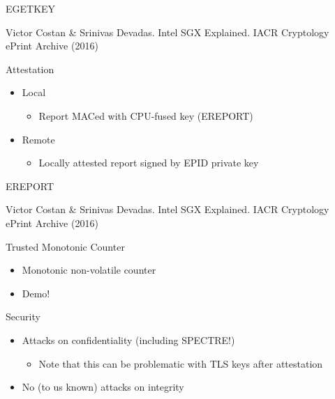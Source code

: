 \documentclass{beamer}
\begin{document}
	\begin{frame}{EGETKEY}
		

		\center\fontsize{4pt}{1}\selectfont
		Victor Costan \& Srinivas Devadas. Intel SGX Explained. IACR Cryptology ePrint Archive (2016)
	\end{frame}

	\begin{frame}{Attestation} %
		\begin{itemize}
			\item Local
				\begin{itemize}
					\item Report MACed with CPU-fused key (EREPORT)
				\end{itemize}
			\item Remote
				\begin{itemize}
					\item Locally attested report signed by EPID private key
				\end{itemize}
		\end{itemize}
	\end{frame}

	\begin{frame}{EREPORT}
		

		\center\fontsize{4pt}{1}\selectfont
		Victor Costan \& Srinivas Devadas. Intel SGX Explained. IACR Cryptology ePrint Archive (2016)
	\end{frame}

	\begin{frame}{Trusted Monotonic Counter} %
		\begin{itemize}
			\item Monotonic non-volatile counter
			\item Demo!
		\end{itemize}
	\end{frame}

	\begin{frame}{Security}	%
		\begin{itemize}
			\item Attacks on confidentiality (including SPECTRE!)
			\begin{itemize}
				\item Note that this can be problematic with TLS keys after attestation
			\end{itemize}
			\item No (to us known) attacks on integrity
		\end{itemize}
	\end{frame}
\end{document}
